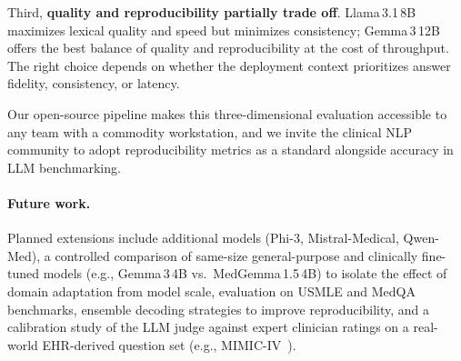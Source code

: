 \documentclass[11pt]{article}
\begin{document}
Third, \textbf{quality and reproducibility partially trade off}.
Llama\,3.1\,8B maximizes lexical quality and speed but minimizes
consistency; Gemma\,3\,12B offers the best balance of quality and
reproducibility at the cost of throughput.
The right choice depends on whether the deployment context prioritizes
answer fidelity, consistency, or latency.

Our open-source pipeline makes this three-dimensional evaluation
accessible to any team with a commodity workstation, and we invite
the clinical NLP community to adopt reproducibility metrics as a
standard alongside accuracy in LLM benchmarking.

\paragraph{Future work.}
Planned extensions include additional models (Phi-3, Mistral-Medical,
Qwen-Med), a controlled comparison of same-size general-purpose and
clinically fine-tuned models (e.g., Gemma\,3\,4B vs.\
MedGemma\,1.5\,4B) to isolate the effect of domain adaptation from
model scale, evaluation on USMLE and MedQA benchmarks, ensemble
decoding strategies to improve reproducibility, and a calibration
study of the LLM judge against expert clinician ratings on a
real-world EHR-derived question set
(e.g., MIMIC-IV~\cite{johnson2023mimic}).
\end{document}
